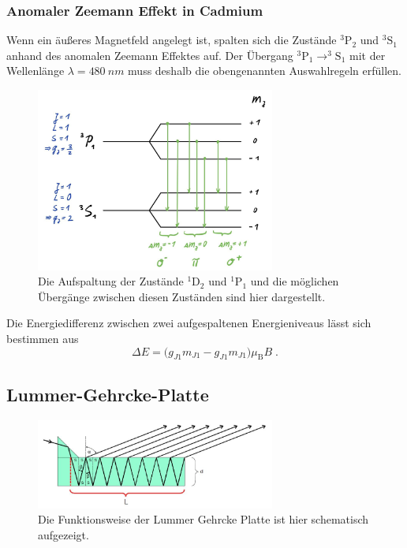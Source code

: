             \subsubsection*{Anomaler Zeemann Effekt in Cadmium}
            Wenn ein äußeres Magnetfeld angelegt ist, spalten sich die Zustände $^3\text{P}_2$ und $^3\text{S}_1$ anhand des anomalen Zeemann Effektes auf.
            Der Übergang $^3\text{P}_1 \rightarrow ^3\text{S}_1$ mit der Wellenlänge $\lambda = \SI{480}{nm}$ muss deshalb die obengenannten Auswahlregeln erfüllen.
            \begin{figure}[h]
                \center
                \includegraphics[width=0.7\textwidth]{bilder/anomalerZeemann.jpeg}
                \caption{Die Aufspaltung der Zustände $^1\text{D}_2$ und $^1\text{P}_1$ und die möglichen Übergänge zwischen diesen Zuständen sind hier dargestellt. \cite{anleitung}}
                \label{fig:anomalerZeemann}
            \end{figure}
            \FloatBarrier
            Die Energiedifferenz zwischen zwei aufgespaltenen Energieniveaus lässt sich bestimmen aus
            \begin{equation}
                \Delta E = \bigl(g_{J1} m_{J1} - g_{J1} m_{J1}\bigr) \mu_{\text{B}} B \;.
            \end{equation}


    \subsection{Lummer-Gehrcke-Platte}
    \label{sec:platte}
        \begin{figure}[h]
            \center
            \includegraphics[width=0.7\textwidth]{bilder/LummerGehrckePlatte.jpeg}
            \caption{Die Funktionsweise der Lummer Gehrcke Platte ist hier schematisch aufgezeigt. \cite{anleitung}}
            \label{fig:LummerGehrckePlatte}
        \end{figure}
        \FloatBarrier

